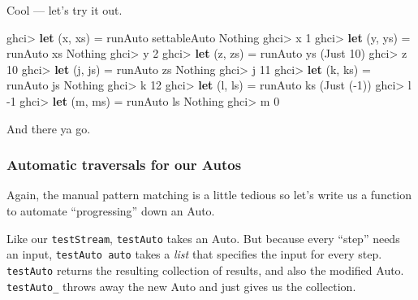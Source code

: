 \documentclass[]{article}
\newenvironment{Shaded}{}{}
\newcommand{\DataTypeTok}[1]{\textcolor[rgb]{0.56,0.13,0.00}{#1}}
\newcommand{\DecValTok}[1]{\textcolor[rgb]{0.25,0.63,0.44}{#1}}
\newcommand{\FunctionTok}[1]{\textcolor[rgb]{0.02,0.16,0.49}{#1}}
\newcommand{\KeywordTok}[1]{\textcolor[rgb]{0.00,0.44,0.13}{\textbf{#1}}}
\newcommand{\NormalTok}[1]{#1}
\begin{document}
Cool --- let's try it out.

\begin{Shaded}
\begin{Highlighting}[]
\NormalTok{ghci}\FunctionTok{>} \KeywordTok{let}\NormalTok{ (x, xs) }\FunctionTok{=}\NormalTok{ runAuto settableAuto }\DataTypeTok{Nothing}
\NormalTok{ghci}\FunctionTok{>}\NormalTok{ x}
\DecValTok{1}
\NormalTok{ghci}\FunctionTok{>} \KeywordTok{let}\NormalTok{ (y, ys) }\FunctionTok{=}\NormalTok{ runAuto xs }\DataTypeTok{Nothing}
\NormalTok{ghci}\FunctionTok{>}\NormalTok{ y}
\DecValTok{2}
\NormalTok{ghci}\FunctionTok{>} \KeywordTok{let}\NormalTok{ (z, zs) }\FunctionTok{=}\NormalTok{ runAuto ys (}\DataTypeTok{Just} \DecValTok{10}\NormalTok{)}
\NormalTok{ghci}\FunctionTok{>}\NormalTok{ z}
\DecValTok{10}
\NormalTok{ghci}\FunctionTok{>} \KeywordTok{let}\NormalTok{ (j, js) }\FunctionTok{=}\NormalTok{ runAuto zs }\DataTypeTok{Nothing}
\NormalTok{ghci}\FunctionTok{>}\NormalTok{ j}
\DecValTok{11}
\NormalTok{ghci}\FunctionTok{>} \KeywordTok{let}\NormalTok{ (k, ks) }\FunctionTok{=}\NormalTok{ runAuto js }\DataTypeTok{Nothing}
\NormalTok{ghci}\FunctionTok{>}\NormalTok{ k}
\DecValTok{12}
\NormalTok{ghci}\FunctionTok{>} \KeywordTok{let}\NormalTok{ (l, ls) }\FunctionTok{=}\NormalTok{ runAuto ks (}\DataTypeTok{Just}\NormalTok{ (}\FunctionTok{-}\DecValTok{1}\NormalTok{))}
\NormalTok{ghci}\FunctionTok{>}\NormalTok{ l}
\FunctionTok{-}\DecValTok{1}
\NormalTok{ghci}\FunctionTok{>} \KeywordTok{let}\NormalTok{ (m, ms) }\FunctionTok{=}\NormalTok{ runAuto ls }\DataTypeTok{Nothing}
\NormalTok{ghci}\FunctionTok{>}\NormalTok{ m}
\DecValTok{0}
\end{Highlighting}
\end{Shaded}

And there ya go.

\hypertarget{automatic-traversals-for-our-autos}{%
\subsubsection{Automatic traversals for our
Autos}\label{automatic-traversals-for-our-autos}}

Again, the manual pattern matching is a little tedious so let's write us a
function to automate ``progressing'' down an Auto.

Like our \texttt{testStream}, \texttt{testAuto} takes an Auto. But because every
``step'' needs an input, \texttt{testAuto\ auto} takes a \emph{list} that
specifies the input for every step. \texttt{testAuto} returns the resulting
collection of results, and also the modified Auto. \texttt{testAuto\_} throws
away the new Auto and just gives us the collection.
\end{document}
